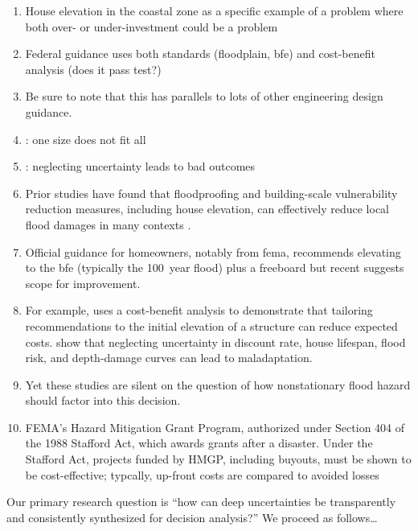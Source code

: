 \documentclass[12pt]{article}
\begin{document}
\begin{enumerate}
    \item House elevation in the coastal zone as a specific example of a problem where both over- or under-investment could be a problem
    \item Federal guidance uses both standards (floodplain, \gls{bfe}) and cost-benefit analysis (does it pass test?)
    \item Be sure to note that this has parallels to lots of other engineering design guidance.
    \item \citet{xian_elevation:2017}: one size does not fit all
    \item \citet{zarekarizi_suboptimal:2020}: neglecting uncertainty leads to bad outcomes
    \item Prior studies have found that floodproofing and building-scale vulnerability reduction measures, including house elevation, can effectively reduce local flood damages in many contexts \citep{demoel_reducing:2014,deruig_building:2020,kreibich_building:2005,slotter_floodproofing:2020,Rozer:2016dn,mobley_mitigation:2020,aerts_cost:2018}.
    \item Official guidance for homeowners, notably from \gls{fema}, recommends elevating to the \gls{bfe} (typically the \SI{100}{year} flood) plus a freeboard \citep{fema_retrofitting:2014,asce_24-14:2015,fema_retrofitting:2014} but recent suggests scope for improvement.
    \item For example, \citet{xian_elevation:2017} uses a cost-benefit analysis to demonstrate that tailoring recommendations to the initial elevation of a structure can reduce expected costs.
          \citet{zarekarizi_suboptimal:2020} show that neglecting uncertainty in discount rate, house lifespan, flood risk, and depth-damage curves can lead to maladaptation.
    \item Yet these studies are silent on the question of how nonstationary flood hazard should factor into this decision.
    \item FEMA's Hazard Mitigation Grant Program, authorized under Section 404 of the 1988 Stafford Act, which awards grants after a disaster. Under the Stafford Act, projects funded by HMGP, including buyouts, must be shown to be cost-effective; typcally, up-front costs are compared to avoided losses \citep{bendor_buyouts:2020}
\end{enumerate}
Our primary research question is ``how can deep uncertainties be transparently and consistently synthesized for decision analysis?''
We proceed as follows\ldots
\end{document}
